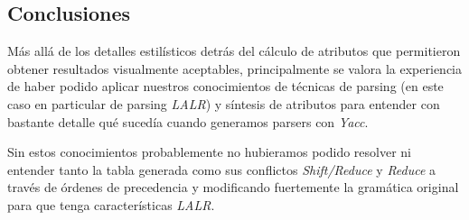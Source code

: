 \subsection{Conclusiones}
Más allá de los detalles estilísticos detrás del cálculo de atributos que permitieron obtener resultados visualmente aceptables, principalmente se valora la experiencia de haber podido aplicar nuestros conocimientos de técnicas de parsing (en este caso en particular de parsing \emph{LALR}) y síntesis de atributos para entender con bastante detalle qué sucedía cuando generamos parsers con \emph{Yacc}. \newline

Sin estos conocimientos probablemente no hubieramos podido resolver ni entender tanto la tabla generada como sus conflictos \emph{Shift/Reduce} y \emph{Reduce} a través de órdenes de precedencia y modificando fuertemente la gramática original para que tenga características \emph{LALR}.
